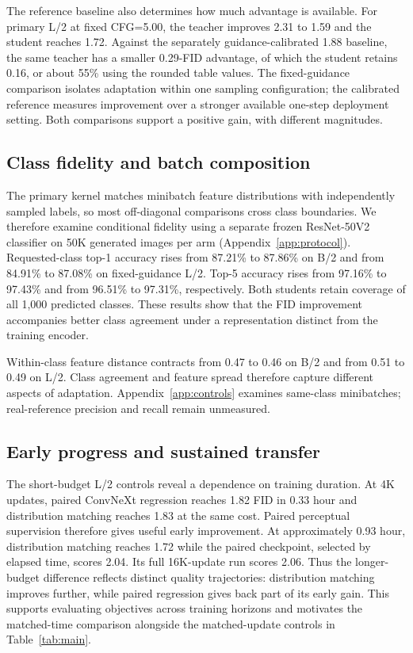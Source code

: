 \documentclass{article}
\begin{document}
The reference baseline also determines how much advantage is available.
For primary L/2 at fixed CFG=5.00, the teacher improves 2.31 to 1.59 and
the student reaches 1.72. Against the separately guidance-calibrated 1.88
baseline, the same teacher has a smaller 0.29-FID advantage, of which the
student retains 0.16, or about 55\% using the rounded table values.
The fixed-guidance comparison isolates adaptation within one sampling
configuration; the calibrated reference measures improvement over a
stronger available one-step deployment setting. Both comparisons support
a positive gain, with different magnitudes.

\subsection{Class fidelity and batch composition}
\label{sec:class-analysis}
The primary kernel matches minibatch feature distributions with independently
sampled labels, so most off-diagonal comparisons cross class boundaries.
We therefore examine conditional fidelity using a separate frozen
ResNet-50V2 classifier on 50K generated images per arm
(Appendix~\ref{app:protocol}). Requested-class top-1 accuracy rises from
87.21\% to 87.86\% on B/2 and from 84.91\% to 87.08\% on fixed-guidance
L/2. Top-5 accuracy rises from 97.16\% to 97.43\% and from 96.51\% to
97.31\%, respectively. Both students retain coverage of all 1,000 predicted
classes. These results show that the FID improvement accompanies better
class agreement under a representation distinct from the training encoder.

Within-class feature distance contracts from 0.47 to 0.46 on B/2 and from
0.51 to 0.49 on L/2. Class agreement and feature spread therefore capture
different aspects of adaptation. Appendix~\ref{app:controls} examines
same-class minibatches; real-reference precision and recall remain unmeasured.

\subsection{Early progress and sustained transfer}
The short-budget L/2 controls reveal a dependence on training duration.
At 4K updates, paired ConvNeXt regression reaches 1.82 FID in 0.33 hour
and distribution matching reaches 1.83 at the same cost. Paired perceptual
supervision therefore gives useful early improvement. At approximately
0.93 hour, distribution matching reaches 1.72 while the paired checkpoint,
selected by elapsed time, scores 2.04. Its full 16K-update run scores 2.06.
Thus the longer-budget difference reflects distinct quality trajectories:
distribution matching improves further, while paired regression gives back
part of its early gain. This supports evaluating objectives across training
horizons and motivates the matched-time comparison alongside the
matched-update controls in Table~\ref{tab:main}.
\end{document}
